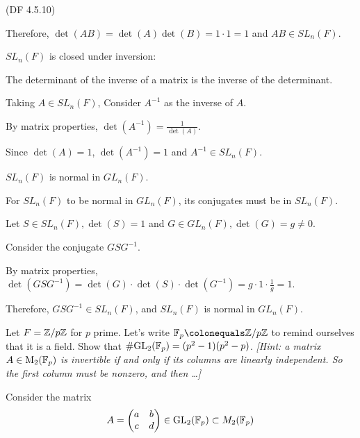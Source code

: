 \begin{problem}{(\textsf{DF 4.5.10})}
\begin{enumalph}
\begin{Answer}
\begin{enumalph}
            \noindent
            Therefore, $\det(AB) = \det(A) \det(B) = 1 \cdot 1 = 1$ and $AB \in SL_n(F)$.
          \item $SL_n(F)$ is closed under inversion:
        
            \noindent
            The determinant of the inverse of a matrix is the inverse of the determinant.

            \noindent
            Taking $A \in SL_n(F)$, Consider $A^{-1}$ as the inverse of $A$.
            
            \noindent
            By matrix properties, $\det(A^{-1}) = \frac{1}{\det(A)}$.
            
            \noindent
            Since $\det(A) = 1$, $\det(A^{-1}) = 1$ and $A^{-1} \in SL_n(F)$.
          
          \item $SL_n(F)$ is normal in $GL_n(F)$.
          
          For $SL_n(F)$ to be normal in $GL_n(F)$, its conjugates must be in $SL_n(F)$.
          
          Let $S \in SL_n(F), \det(S) = 1$ and $G \in GL_n(F), \det(G) = g \neq 0$.

          \noindent
          Consider the conjugate $GSG^{-1}$.
          
          \noindent
          By matrix properties, $\det(GSG^{-1}) = \det(G) \cdot \det(S) \cdot \det(G^{-1}) = g \cdot 1 \cdot \frac{1}{g} = 1$.

          \noindent
          Therefore, $GSG^{-1} \in SL_n(F)$, and $SL_n(F)$ is normal in $GL_n(F)$.
          
        \end{enumalph}
      \end{Answer}
      
    \newpage
    \item Let $F=\mathbb{Z}/p\mathbb{Z}$ for $p$ prime.
      Let's write $\F_p \colonequals \Z/p\Z$ to remind ourselves that it is a field.
      Show that $\#\mathrm{GL}_2(\mathbb{F}_p)=(p^2-1)(p^2-p)$.
      \emph{[Hint: a matrix $A \in \operatorname{M}_2(\mathbb{F}_p)$ is invertible if and only if its columns 
      are linearly independent.  So the first column must be nonzero, and then \ldots ]}

      \begin{Answer}
        Consider the matrix \[A = \begin{pmatrix} a & b \\ c & d \end{pmatrix} \in \mathrm{GL}_2(\mathbb{F}_p) \subset M_2(\mathbb{F}_p)\]


\end{Answer}
\end{enumalph}
\end{problem}
